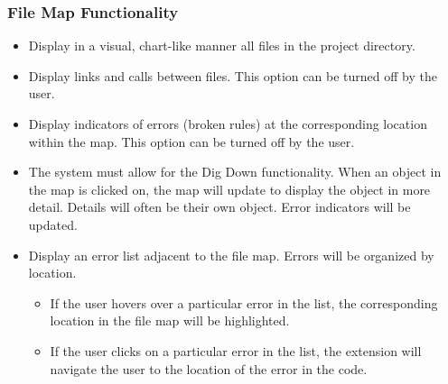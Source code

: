 \documentclass[letterpaper,10pt,titlepage,draftclsnofoot,onecolumn,onesided] {IEEEtran}
\begin{document}
\subsubsection{File Map Functionality}
\begin{itemize}
	\item Display in a visual, chart-like manner all files in the project directory.
    \item Display links and calls between files. This option can be turned off by the user.
    \item Display indicators of errors (broken rules) at the corresponding location within the map. This option can be turned off by the user.
    \item The system must allow for the Dig Down functionality. When an object in the map is clicked on, the map will update to display the object in more detail. Details will often be their own object. Error indicators will be updated.
    \item Display an error list adjacent to the file map. Errors will be organized by location.
    \begin{itemize}
    	\item If the user hovers over a particular error in the list, the corresponding location in the file map will be 	highlighted.
        \item If the user clicks on a particular error in the list, the extension will navigate the user to the location of the error in the code.
    \end{itemize}
\end{itemize}
\end{document}
